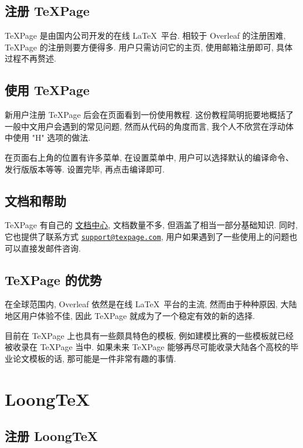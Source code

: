 \subsection{注册 TeXPage}

TeXPage 是由国内公司开发的在线 \LaTeX\ 平台.
相较于 Overleaf 的注册困难,
TeXPage 的注册则要方便得多.
用户只需访问它的主页,
使用邮箱注册即可,
具体过程不再赘述.

\subsection{使用 TeXPage}

新用户注册 TeXPage 后会在页面看到一份使用教程.
这份教程简明扼要地概括了一般中文用户会遇到的常见问题,
然而从代码的角度而言,
我个人不欣赏在浮动体中使用 "H" 选项的做法.

在页面右上角的位置有许多菜单,
在\textsf{设置}菜单中,
用户可以选择默认的编译命令、发行版版本等等.
设置完毕,
再点击编译即可.

\subsection{文档和帮助}

TeXPage 有自己的 \href{https://www.texpage.com/docs}{文档中心},
文档数量不多,
但涵盖了相当一部分基础知识.
同时,
它也提供了联系方式 \href{mailto:support@texpage.com}%
{\texttt{support@texpage.com}},
用户如果遇到了一些使用上的问题也可以直接发邮件咨询.

\subsection{TeXPage 的优势}

在全球范围内,
Overleaf 依然是在线 \LaTeX\ 平台的主流,
然而由于种种原因,
大陆地区用户体验不佳,
因此 TeXPage 就成为了一个稳定有效的新的选择.

目前在 TeXPage 上也具有一些颇具特色的模板,
例如建模比赛的一些模板就已经被收录在 TeXPage 当中.
如果未来 TeXPage 能够再尽可能收录大陆各个高校的毕业论文模板的话,
那可能是一件非常有趣的事情.

\section{LoongTeX}

\subsection{注册 LoongTeX}

